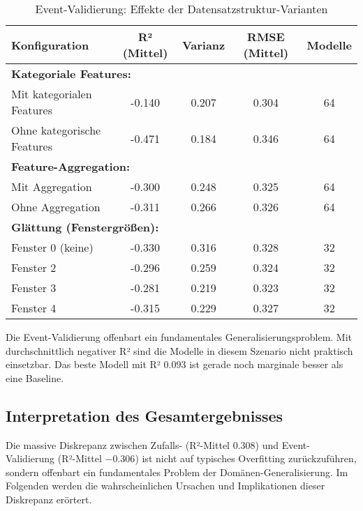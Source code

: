\begin{table}[H]
  \centering
  \begin{tabular}{lcccc}
    \toprule
    \textbf{Konfiguration} & \textbf{R² (Mittel)} & \textbf{Varianz} & \textbf{RMSE (Mittel)} & \textbf{Modelle} \\
    \midrule
    \multicolumn{5}{l}{\textbf{Kategoriale Features:}} \\
    Mit kategorialen Features & -0.140 & 0.207 & 0.304 & 64 \\
    Ohne kategorische Features & -0.471 & 0.184 & 0.346 & 64 \\
    \midrule
    \multicolumn{5}{l}{\textbf{Feature-Aggregation:}} \\
    Mit Aggregation & -0.300 & 0.248 & 0.325 & 64 \\
    Ohne Aggregation & -0.311 & 0.266 & 0.326 & 64 \\
    \midrule
    \multicolumn{5}{l}{\textbf{Glättung (Fenstergrößen):}} \\
    Fenster 0 (keine) & -0.330 & 0.316 & 0.328 & 32 \\
    Fenster 2 & -0.296 & 0.259 & 0.324 & 32 \\
    Fenster 3 & -0.281 & 0.219 & 0.323 & 32 \\
    Fenster 4 & -0.315 & 0.229 & 0.327 & 32 \\
    \bottomrule
  \end{tabular}
  \caption{Event-Validierung: Effekte der Datensatzstruktur-Varianten}
  \label{tab:structure_event}
\end{table}

Die Event-Validierung offenbart ein fundamentales Generalisierungsproblem. Mit durchschnittlich negativer R² sind die Modelle in diesem Szenario nicht praktisch einsetzbar. Das beste Modell mit R² $0.093$ ist gerade noch marginale besser als eine Baseline.

\subsection{Interpretation des Gesamtergebnisses}

Die massive Diskrepanz zwischen Zufalls- (R²-Mittel $0.308$) und Event-Validierung (R²-Mittel $-0.306$) ist nicht auf typisches Overfitting zurückzuführen, sondern offenbart ein fundamentales Problem der Domänen-Generalisierung. Im Folgenden werden die wahrscheinlichen Ursachen und Implikationen dieser Diskrepanz erörtert.

